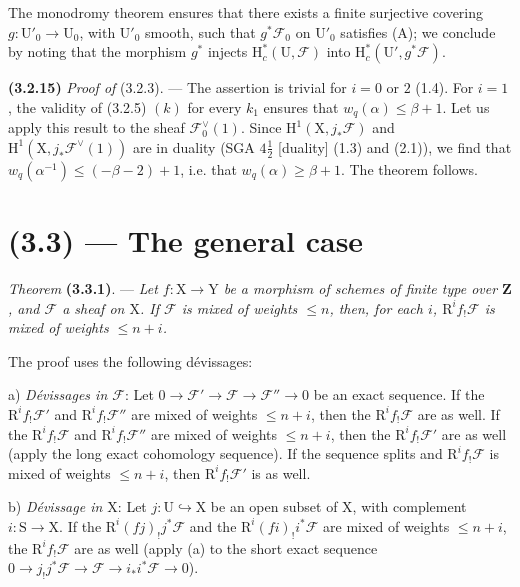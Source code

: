 \documentclass[11pt,leqno]{article}
\begin{document}
The monodromy theorem ensures that there exists a finite surjective covering \(g:\mathrm{U}'_0\to\mathrm{U}_0\), with \(\mathrm{U}'_0\) smooth, such that \(g^*\mathscr{F}_0\) on \(\mathrm{U}'_0\) satisfies (A); we conclude by noting that the morphism \(g^*\) injects \(\mathrm{H}_c^*(\mathrm{U},\mathscr{F})\) into \(\mathrm{H}_c^*(\mathrm{U}',g^*\mathscr{F})\).

\textbf{(3.2.15)} \textit{Proof of} (3.2.3). — The assertion is trivial for \(i=0\) or \(2\) (1.4). For \(i=1\), the validity of (3.2.5) \((k)\) for every \(k_1\) ensures that \(w_q(\alpha)\leq\beta+1\). Let us apply this result to the sheaf \(\mathscr{F}_0^\vee(1)\). Since \(\mathrm{H}^1(\mathrm{X},j_*\mathscr{F})\) and \(\mathrm{H}^1(\mathrm{X},j_*\mathscr{F}^\vee(1))\) are in duality (SGA \(4\frac{1}{2}\) [duality] (1.3) and (2.1)), we find that \(w_q(\alpha^{-1})\leq(-\beta-2)+1\), i.e. that \(w_q(\alpha)\geq\beta+1\). The theorem follows.

\section*{(3.3) — The general case}

\textit{Theorem} \textbf{(3.3.1)}. — \textit{Let \(f:\mathrm{X}\to\mathrm{Y}\) be a morphism of schemes of finite type over \(\mathbf{Z}\), and \(\mathscr{F}\) a sheaf on \(\mathrm{X}\). If \(\mathscr{F}\) is mixed of weights \(\leq n\), then, for each \(i\), \(\mathrm{R}^if_!\mathscr{F}\) is mixed of weights \(\leq n+i\).}

The proof uses the following dévissages:

a) \textit{Dévissages in \(\mathscr{F}\)}: Let \(0\to\mathscr{F}'\to\mathscr{F}\to\mathscr{F}''\to0\) be an exact sequence. If the \(\mathrm{R}^if_!\mathscr{F}'\) and \(\mathrm{R}^if_!\mathscr{F}''\) are mixed of weights \(\leq n+i\), then the \(\mathrm{R}^if_!\mathscr{F}\) are as well. If the \(\mathrm{R}^if_!\mathscr{F}\) and \(\mathrm{R}^if_!\mathscr{F}''\) are mixed of weights \(\leq n+i\), then the \(\mathrm{R}^if_!\mathscr{F}'\) are as well (apply the long exact cohomology sequence). If the sequence splits and \(\mathrm{R}^if_!\mathscr{F}\) is mixed of weights \(\leq n+i\), then \(\mathrm{R}^if_!\mathscr{F}'\) is as well.

b) \textit{Dévissage in \(\mathrm{X}\)}: Let \(j:\mathrm{U}\hookrightarrow\mathrm{X}\) be an open subset of \(\mathrm{X}\), with complement \(i:\mathrm{S}\to\mathrm{X}\). If the \(\mathrm{R}^i(fj)_!j^*\mathscr{F}\) and the \(\mathrm{R}^i(fi)_!i^*\mathscr{F}\) are mixed of weights \(\leq n+i\), the \(\mathrm{R}^if_!\mathscr{F}\) are as well (apply (a) to the short exact sequence \(0\to j_!j^*\mathscr{F}\to\mathscr{F}\to i_*i^*\mathscr{F}\to0\)).
\end{document}
